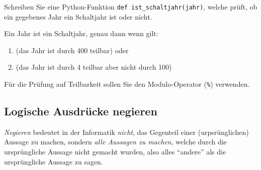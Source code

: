 \begin{mychallenge}
	Schreiben Sie eine Python-Funktion \lstinline|def ist_schaltjahr(jahr)|, welche prüft, ob ein gegebenes Jahr ein Schaltjahr ist oder nicht.

	Ein Jahr ist ein Schaltjahr, genau dann wenn gilt:
	\begin{enumerate}
		\item (das Jahr ist durch 400 teilbar) oder
		\item (das Jahr ist durch 4 teilbar aber nicht durch 100)
	\end{enumerate}
	Für die Prüfung auf Teilbarkeit sollen Sie den Modulo-Operator (\lstinline|%|) verwenden.
	\begin{myanswer}
		
	\end{myanswer}
\end{mychallenge}

\subsection{Logische Ausdrücke negieren}
\textit{Negieren} bedeutet in der Informatik \textit{nicht}, das Gegenteil einer (urpsrünglichen) Aussage zu machen, sondern \textit{alle Aussagen zu machen}, welche durch die ursprüngliche Aussage nicht gemacht wurden, also alles ``andere'' als die ursprüngliche Aussage zu sagen.

